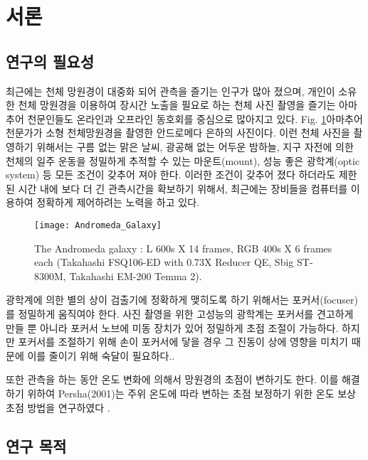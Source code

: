 \section{서론}

\subsection{연구의 필요성}

최근에는 천체 망원경이 대중화 되어 관측을 즐기는 인구가 많아 졌으며, 개인이 소유한 천체 망원경을 이용하여 장시간 노출을 필요로 하는 천체 사진 촬영을 즐기는 아마추어 천문인들도 온라인과 오프라인 동호회를 중심으로 많아지고 있다. Fig. \ref{fig:The_Andromeda_Galaxy}\은 아마추어 천문가가 소형 천체망원경을 촬영한 안드로메다 은하의 사진이다. 이런 천체 사진을 촬영하기 위해서는 구름 없는 맑은 날씨, 광공해 없는 어두운 밤하늘, 지구 자전에 의한 천체의 일주 운동을 정밀하게 추적할 수 있는 마운트(mount), 성능 좋은 광학계(optic system) 등 모든 조건이 갖추어 져야 한다. 이러한 조건이 갖추어 졌다 하더라도 제한된 시간 내에 보다 더 긴 관측시간을 확보하기 위해서, 최근에는 장비들을 컴퓨터를 이용하여 정확하게 제어하려는 노력을 하고 있다. 

\begin{figure}[H]
	\begin{center}
		\texttt{[image: Andromeda\_Galaxy]}
	\end{center}
		\caption{The Andromeda galaxy : L 600s X 14 frames, RGB 400s X 6 frames each (Takahashi FSQ106-ED with 0.73X Reducer QE, Sbig ST-8300M, Takahashi EM-200 Temma 2).}
		\label{fig:The_Andromeda_Galaxy}
\end{figure}

광학계에 의한 별의 상이 검출기에 정확하게 맺히도록 하기 위해서는 포커서(focuser)를 정밀하게 움직여야 한다. 사진 촬영을 위한 고성능의 광학계는 포커서를 견고하게 만들 뿐 아니라 포커서 노브에 미동 장치가 있어 정밀하게 초점 조절이 가능하다. 하지만 포커서를 조절하기 위해 손이 포커서에 닿을 경우 그 진동이 상에 영향을 미치기 때문에 이를 줄이기 위해 숙달이 필요하다.. 

또한 관측을 하는 동안 온도 변화에 의해서 망원경의 초점이 변하기도 한다. 이를 해결하기 위하여 Persha(2001)는 주위 온도에 따라 변하는 초점 보정하기 위한 온도 보상 초점 방법을 연구하였다 \cite{persha2001temperature}.


\subsection{연구 목적}

